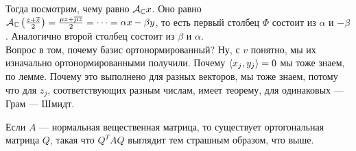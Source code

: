 \documentclass{article}
\begin{document}
\begin{itemize}
\begin{Proof}
            Тогда посмотрим, чему равно ${\mathcal{A}}_{\mathbb C}x$. Оно равно ${\mathcal{A}}_{\mathbb C}\left(\frac{z+\overline z}2\right)=\frac{\mu z+\overline\mu\overline z}2=\cdots=\alpha x-\beta y$, то есть первый столбец $\Phi$ состоит из $\alpha$ и $-\beta$. Аналогично второй столбец состоит из $\beta$ и $\alpha$.\\
            Вопрос в том, почему базис ортонормированный? Ну, с $v$ понятно, мы их изначально ортонормированными получили. Почему ${\left\langle{x_j},{y_j}\right\rangle}=0$ мы тоже знаем, по лемме. Почему это выполнено для разных векторов, мы тоже знаем, потому что для $z_j$, соответствующих разным числам, имеет теорему, для одинаковых --- Грам --- Шмидт.
        \end{Proof}
        \thm Если $A$ --- нормальная вещественная матрица, то существует ортогональная матрица $Q$, такая что $Q^TAQ$ выглядит тем страшным образом, что выше.
    \end{itemize}
\end{document}
